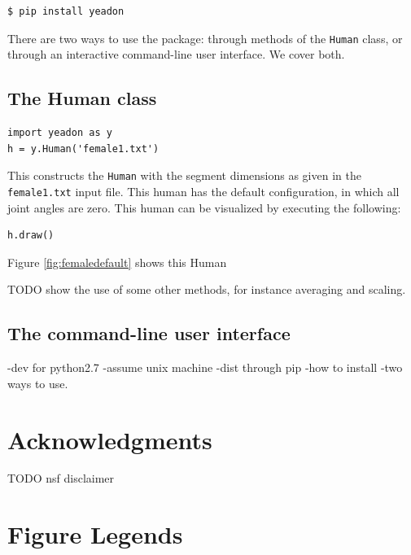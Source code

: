 \documentclass[10pt]{article}
\begin{document}
\begin{verbatim}
$ pip install yeadon
\end{verbatim}

There are two ways to use the package: through methods of the \verb+Human+
class, or through an interactive command-line user interface. We cover both.



\subsection*{The Human class}

\begin{verbatim}
import yeadon as y
h = y.Human('female1.txt')
\end{verbatim}

This constructs the \verb+Human+ with the segment dimensions as given in the
\verb+female1.txt+ input file. This human has the default configuration, in
which all joint angles are zero. This human can be visualized by executing the
following:

\begin{verbatim}
h.draw()
\end{verbatim}

Figure \ref{fig:femaledefault} shows this Human

TODO show the use of some other methods, for instance averaging and scaling.

\subsection*{The command-line user interface}


-dev for python2.7
-assume unix machine
-dist through pip
-how to install
-two ways to use.



\section*{Acknowledgments}
TODO nsf disclaimer


\section*{Figure Legends}
\end{document}
